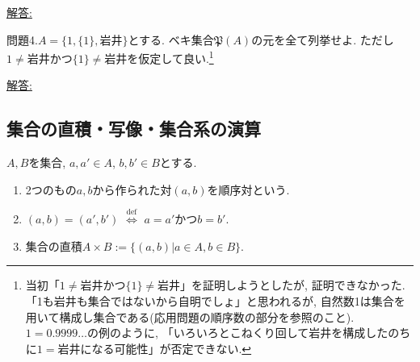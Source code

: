 \documentclass[dvipdfmx,a4paper,11pt]{article}
\theoremstyle{definition}
\begin{document}
\vspace{30pt}
  { \large \underline{解答: \hspace{13cm}}}
  
\vspace{30pt}
問題4.$A = \{ 1, \{1\}, \text{岩井}\}$とする. ベキ集合$\mathfrak{P}(A)$の元を全て列挙せよ. 
ただし$1 \neq\text{岩井}$かつ$\{ 1\} \neq \text{岩井}$を仮定して良い.\footnote{当初「$1 \neq\text{岩井}$かつ$\{ 1\} \neq \text{岩井}$」を証明しようとしたが, 証明できなかった. 「1も岩井も集合ではないから自明でしょ」と思われるが, 自然数1は集合を用いて構成し集合である(応用問題の順序数の部分を参照のこと). $1=0.9999\ldots$の例のように, 「いろいろとこねくり回して岩井を構成したのちに$1=\text{岩井}$になる可能性」が否定できない. }

\vspace{80pt}
  { \large \underline{解答: \hspace{13cm}}}
\newpage

 \begin{center}
\section{集合の直積・写像・集合系の演算}
\label{sec-2}
\end{center}


\begin{tcolorbox}[
    colback = white,
    colframe = black!35!black,
    fonttitle = \bfseries,
    breakable = true]
    $A,B$を集合, $a, a' \in A$, $b, b' \in B$とする. 
    \begin{enumerate}
    \setlength{\parskip}{0cm} 
  \setlength{\itemsep}{0cm} 
    \item 2つのもの$a,b$から作られた対$(a,b)$を順序対という. 
    \item $(a, b)=(a', b')$  $\stackrel{\mathrm{def}}{\Longleftrightarrow}$ $a=a'$かつ$b=b'$.
    \item 集合の直積$A \times B:= \{ (a,b) | a \in A, b \in B\}$.
    \end{enumerate}
 \end{tcolorbox}
 
\end{document}
